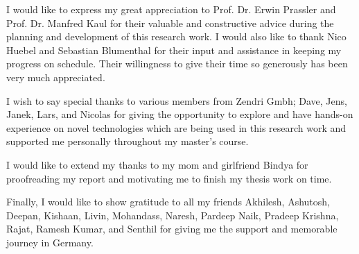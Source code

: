 

    \begin{acknowledgements}
        I would like to express my great appreciation to Prof. Dr. Erwin Prassler and Prof. Dr. Manfred Kaul for their valuable and constructive advice during the planning and development of this research work. I would also like to thank Nico Huebel and Sebastian Blumenthal for their input and assistance in keeping my progress on schedule. Their willingness to give their time so generously has been very much appreciated.
        
        I wish to say special thanks to various members from Zendri Gmbh; Dave, Jens, Janek, Lars, and Nicolas for giving the opportunity to explore and have hands-on experience on novel technologies which are being used in this research work and supported me personally throughout my master's course.
        
        I would like to extend my thanks to my mom and girlfriend Bindya for proofreading my report and motivating me to finish my thesis work on time.
        
        
        Finally, I would like to show gratitude to all my friends Akhilesh, Ashutosh, Deepan, Kishaan, Livin, Mohandass, Naresh, Pardeep Naik, Pradeep Krishna, Rajat, Ramesh Kumar, and Senthil for giving me the support and memorable journey in Germany.
    \end{acknowledgements}

